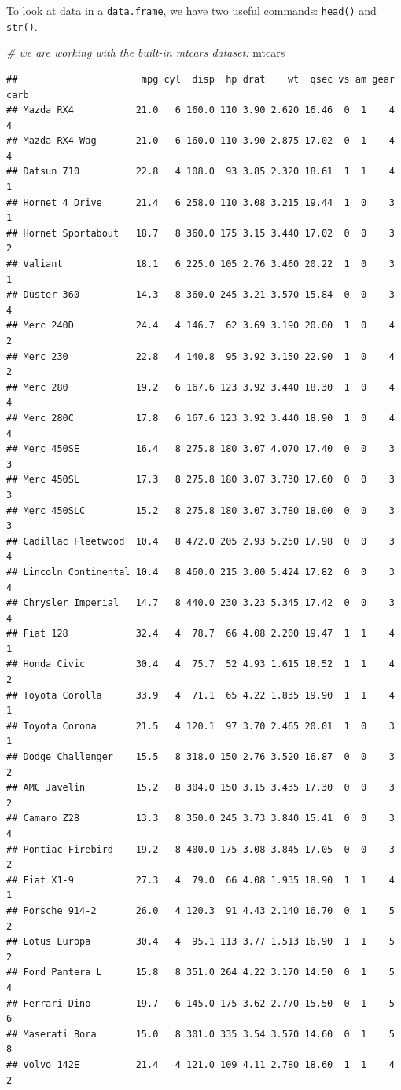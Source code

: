\documentclass[]{book}
\newenvironment{Shaded}{\begin{snugshade}}{\end{snugshade}}
\newcommand{\CommentTok}[1]{\textcolor[rgb]{0.56,0.35,0.01}{\textit{#1}}}
\newcommand{\NormalTok}[1]{#1}
\begin{document}
To look at data in a \texttt{data.frame}, we have two useful commands:
\texttt{head()} and \texttt{str()}.

\begin{Shaded}
\begin{Highlighting}[]
\CommentTok{# we are working with the built-in mtcars dataset:}
\NormalTok{mtcars}
\end{Highlighting}
\end{Shaded}

\begin{verbatim}
##                      mpg cyl  disp  hp drat    wt  qsec vs am gear carb
## Mazda RX4           21.0   6 160.0 110 3.90 2.620 16.46  0  1    4    4
## Mazda RX4 Wag       21.0   6 160.0 110 3.90 2.875 17.02  0  1    4    4
## Datsun 710          22.8   4 108.0  93 3.85 2.320 18.61  1  1    4    1
## Hornet 4 Drive      21.4   6 258.0 110 3.08 3.215 19.44  1  0    3    1
## Hornet Sportabout   18.7   8 360.0 175 3.15 3.440 17.02  0  0    3    2
## Valiant             18.1   6 225.0 105 2.76 3.460 20.22  1  0    3    1
## Duster 360          14.3   8 360.0 245 3.21 3.570 15.84  0  0    3    4
## Merc 240D           24.4   4 146.7  62 3.69 3.190 20.00  1  0    4    2
## Merc 230            22.8   4 140.8  95 3.92 3.150 22.90  1  0    4    2
## Merc 280            19.2   6 167.6 123 3.92 3.440 18.30  1  0    4    4
## Merc 280C           17.8   6 167.6 123 3.92 3.440 18.90  1  0    4    4
## Merc 450SE          16.4   8 275.8 180 3.07 4.070 17.40  0  0    3    3
## Merc 450SL          17.3   8 275.8 180 3.07 3.730 17.60  0  0    3    3
## Merc 450SLC         15.2   8 275.8 180 3.07 3.780 18.00  0  0    3    3
## Cadillac Fleetwood  10.4   8 472.0 205 2.93 5.250 17.98  0  0    3    4
## Lincoln Continental 10.4   8 460.0 215 3.00 5.424 17.82  0  0    3    4
## Chrysler Imperial   14.7   8 440.0 230 3.23 5.345 17.42  0  0    3    4
## Fiat 128            32.4   4  78.7  66 4.08 2.200 19.47  1  1    4    1
## Honda Civic         30.4   4  75.7  52 4.93 1.615 18.52  1  1    4    2
## Toyota Corolla      33.9   4  71.1  65 4.22 1.835 19.90  1  1    4    1
## Toyota Corona       21.5   4 120.1  97 3.70 2.465 20.01  1  0    3    1
## Dodge Challenger    15.5   8 318.0 150 2.76 3.520 16.87  0  0    3    2
## AMC Javelin         15.2   8 304.0 150 3.15 3.435 17.30  0  0    3    2
## Camaro Z28          13.3   8 350.0 245 3.73 3.840 15.41  0  0    3    4
## Pontiac Firebird    19.2   8 400.0 175 3.08 3.845 17.05  0  0    3    2
## Fiat X1-9           27.3   4  79.0  66 4.08 1.935 18.90  1  1    4    1
## Porsche 914-2       26.0   4 120.3  91 4.43 2.140 16.70  0  1    5    2
## Lotus Europa        30.4   4  95.1 113 3.77 1.513 16.90  1  1    5    2
## Ford Pantera L      15.8   8 351.0 264 4.22 3.170 14.50  0  1    5    4
## Ferrari Dino        19.7   6 145.0 175 3.62 2.770 15.50  0  1    5    6
## Maserati Bora       15.0   8 301.0 335 3.54 3.570 14.60  0  1    5    8
## Volvo 142E          21.4   4 121.0 109 4.11 2.780 18.60  1  1    4    2
\end{verbatim}
\end{document}
